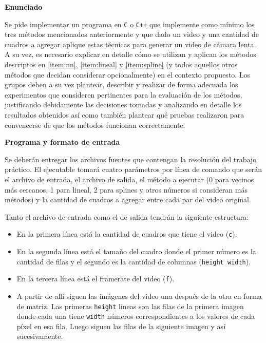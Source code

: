 \vskip 5pt

{\bf\noindent Enunciado}

Se pide implementar un programa en \verb-C- o \verb-C++- que implemente como m\'inimo los tres m\'etodos mencionados anteriormente y que dado un video y una cantidad de cuadros a agregar aplique estas t\'ecnicas para generar un video de cámara lenta. A su vez, es necesario explicar en detalle c\'omo se utilizan y aplican los m\'etodos descriptos en \ref{item:nn}, \ref{item:lineal} y \ref{item:spline} (y todos aquellos otros m\'etodos que decidan considerar opcionalmente) en el contexto propuesto. Los grupos deben a su vez plantear, describir y realizar de forma adecuada los experimentos que consideren pertinentes para la evaluaci\'on de los m\'etodos, justificando debidamente las decisiones tomadas y analizando en detalle los resultados obtenidos as\'i como tambi\'en plantear qu\'e pruebas realizaron para convencerse de que los m\'etodos funcionan correctamente.


{\bf\noindent Programa y formato de entrada}

Se deberán entregar los archivos fuentes que contengan la resolución del trabajo práctico. El ejecutable tomará cuatro parámetros por línea de comando que serán el archivo de entrada, el archivo de salida, el método a ejecutar (0 para vecinos más cercanos, 1 para lineal, 2 para splines y otros números si consideran más métodos) y la cantidad de cuadros a agregar entre cada par del video original.

Tanto el archivo de entrada como el de salida tendrán la siguiente estructura:

\begin{itemize}
  \item En la primera línea está la cantidad de cuadros que tiene el video (\verb|c|).
  \item En la segunda línea está el tamaño del cuadro donde el primer número es la cantidad de filas y el segundo es la cantidad de columnas (\verb|height width|).
  \item En la tercera línea está el framerate del video (\verb|f|).
  \item A partir de allí siguen las imágenes del video una después de la otra en forma de matriz. Las primeras \verb|height| l\'ineas son las filas de la primera imagen donde cada una tiene \verb|width| n\'umeros correspondientes a los valores de cada píxel en esa fila. Luego siguen las filas de la siguiente imagen y as\'i sucesivamente.
\end{itemize}

